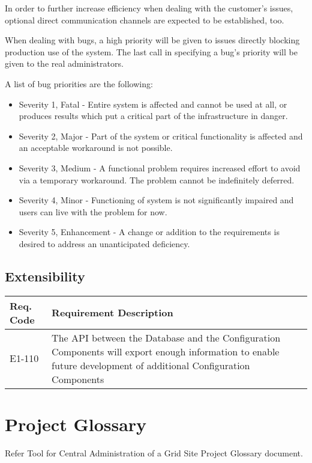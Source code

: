 \documentclass[12pt]{article}
\begin{document}
In order to further increase efficiency when dealing with the customer's issues,
optional direct communication channels are expected to be established, too.

When dealing with bugs, a high priority will be given to issues directly
blocking production use of the system.  The last call in specifying a bug's
priority will be given to the real administrators.

A list of bug priorities are the following:
\begin{itemize}
	\item Severity 1, Fatal - Entire system is affected and cannot be used at
        all, or produces results which put a critical part of the infrastructure
        in danger.
	\item Severity 2, Major - Part of the system or critical functionality is affected and an acceptable workaround is not possible.
	\item Severity 3, Medium - A functional problem requires increased effort to avoid via a temporary workaround. The problem cannot be indefinitely deferred.
	\item Severity 4, Minor - Functioning of system is not significantly impaired and users can live with the problem for now.
	\item Severity 5, Enhancement - A change or addition to the requirements is desired to address an unanticipated deficiency.
\end{itemize}


\subsection{Extensibility}

\begin{center}
	\begin{tabular}{| p{2.5cm} | p{12.5cm} |}
		\hline
		\textbf{Req. Code} & \textbf{Requirement Description}\\
		\hline
        E1-110	& The API between the Database and the Configuration Components
        will export enough information to enable future development of
        additional Configuration Components\\
		\hline
	\end{tabular}
	\label{tab:ExtensibilityRequirements}
\end{center}


\section{Project Glossary}
Refer Tool for Central Administration of a Grid Site Project Glossary document.
\end{document}
